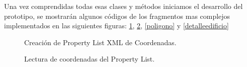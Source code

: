  Una vez comprendidas todas esas clases y métodos iniciamos el desarrollo del prototipo, se mostrarán algunos códigos de los fragmentos mas complejos implementados en las siguientes figuras: \ref{plist}, \ref{edificioplist}, \ref{poligono} y \ref{detalleedificio}
  \begin{figure}[h!]
 	\begin{center}
 		\caption{Creación de Property List XML de Coordenadas.}
 		\label{plist}
 	\end{center}
 \end{figure}
 \begin{figure}[h!]
	\begin{center}
		\caption{Lectura de coordenadas del Property List.}
		\label{edificioplist}
	\end{center}
\end{figure}
